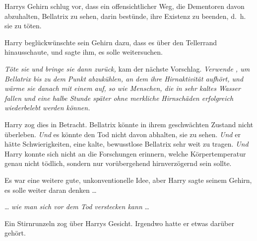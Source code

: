 Harrys Gehirn schlug vor, dass ein offensichtlicher Weg, die Dementoren davon abzuhalten, Bellatrix zu sehen, darin bestünde, ihre Existenz zu beenden, d.~h. sie zu töten.

Harry beglückwünschte sein Gehirn dazu, dass es über den Tellerrand hinausschaute, und sagte ihm, es solle weitersuchen.

\emph{Töte sie und bringe sie dann zurück,} kam der nächste Vorschlag. \emph{Verwende , um Bellatrix bis zu dem Punkt abzukühlen, an dem ihre Hirnaktivität aufhört, und wärme sie danach mit einem  auf, so wie Menschen, die in sehr kaltes Wasser fallen und eine halbe Stunde später ohne merkliche Hirnschäden erfolgreich wiederbelebt werden können.}

Harry zog dies in Betracht. Bellatrix könnte in ihrem geschwächten Zustand nicht überleben. \emph{Und} es könnte den Tod nicht davon abhalten, sie zu sehen. \emph{Und} er hätte Schwierigkeiten, eine kalte, bewusstlose Bellatrix sehr weit zu tragen. \emph{Und} Harry konnte sich nicht an die Forschungen erinnern, welche Körpertemperatur genau nicht tödlich, sondern nur vorübergehend hirnverzögernd sein sollte.

Es war eine weitere gute, unkonventionelle Idee, aber Harry sagte seinem Gehirn, es solle weiter daran denken …

… \emph{wie man sich vor dem Tod verstecken kann} …

Ein Stirnrunzeln zog über Harrys Gesicht. Irgendwo hatte er etwas darüber gehört.

